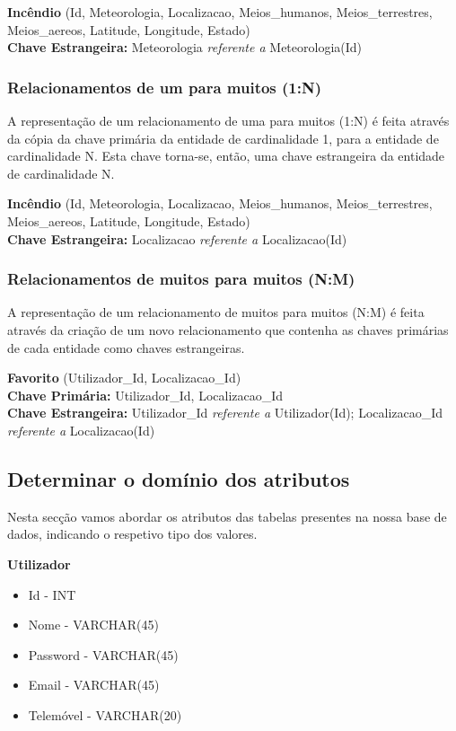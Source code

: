 \documentclass[a4paper,12pt]{scrreprt}
\begin{document}
\textbf{Incêndio} (Id, Meteorologia, Localizacao, Meios\_humanos, Meios\_terrestres, Meios\_aereos, Latitude, Longitude, Estado) \\
\textbf{Chave Estrangeira:} Meteorologia \textit{referente a} Meteorologia(Id)

\subsubsection{Relacionamentos de um para muitos (1:N)}

A representação de um relacionamento de uma para muitos (1:N) é feita através da cópia da chave primária da entidade de cardinalidade 1, para a entidade de cardinalidade N. Esta chave torna-se, então, uma chave estrangeira da entidade de cardinalidade N.

\textbf{Incêndio} (Id, Meteorologia, Localizacao, Meios\_humanos, Meios\_terrestres, Meios\_aereos, Latitude, Longitude, Estado) \\
\textbf{Chave Estrangeira:} Localizacao \textit{referente a} Localizacao(Id)

\subsubsection{Relacionamentos de muitos para muitos (N:M)}

A representação de um relacionamento de muitos para muitos (N:M) é feita através da criação de um novo relacionamento que contenha as chaves primárias de cada entidade como chaves estrangeiras.

\textbf{Favorito} (Utilizador\_Id, Localizacao\_Id) \\
\textbf{Chave Primária:} Utilizador\_Id, Localizacao\_Id \\
\textbf{Chave Estrangeira:} Utilizador\_Id \textit{referente a} Utilizador(Id); Localizacao\_Id \textit{referente a} Localizacao(Id)

\subsection{Determinar o domínio dos atributos}

Nesta secção vamos abordar os atributos das tabelas presentes na nossa base de dados, indicando o respetivo tipo dos valores.

\textbf{Utilizador}

\begin{itemize}
    \item Id - INT
    \item Nome - VARCHAR(45)
    \item Password - VARCHAR(45)
    \item Email - VARCHAR(45)
    \item Telemóvel - VARCHAR(20)
\end{itemize}
\end{document}
